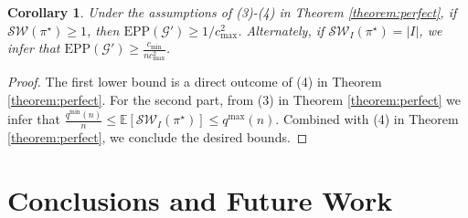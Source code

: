 \documentclass[letterpaper]{article} %
\newtheorem{corollary}{Corollary}
\DeclareMathOperator*{\argmax}{arg\,max}
\begin{document}
\begin{corollary}
\label{corollary:almost-sure-lower-bound}
Under the assumptions of (3)-(4) in Theorem \ref{theorem:perfect}, if $\mathcal{SW}(\pi^\star) \geq 1$, then $\text{EPP}(\mathcal{G}') \geq 1 / c_{\max}^2$. Alternately, if $\mathcal{SW}_I(\pi^\star) = |I|$, we infer that $\text{EPP}(\mathcal{G}') \geq \frac{c_{\min}}{n c_{\max}^2}$.
\end{corollary}
\begin{proof}
The first lower bound is a direct outcome of (4) in Theorem \ref{theorem:perfect}. For the second part, from (3) in Theorem \ref{theorem:perfect} we infer that $\frac{q^{\min}(n)}{n} \leq \mathbb{E}[\mathcal{SW}_I(\pi^\star)] \leq q^{\max}(n)$. Combined with (4) in Theorem \ref{theorem:perfect}, we conclude the desired bounds.
\end{proof}





\section{Conclusions and Future Work}
\label{sec:Conclusions and Future Work}
\end{document}
